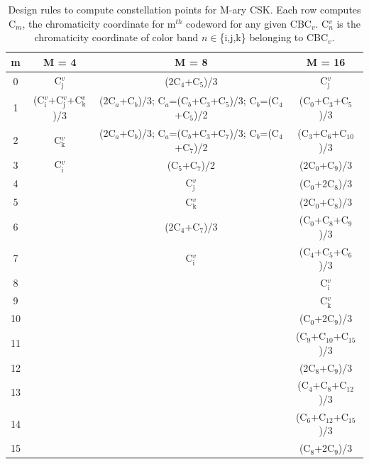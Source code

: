 \documentclass[10pt,letterpaper]{article}
\begin{document}
\begin{table}[t]
\centering
\begin{tabular}{|c|c|c|c|}
\hline
\textbf{m} & \textbf{M = 4} & \textbf{M = 8} & \textbf{M = 16} \\
\hline
0 & C$^{v}_{\text{j}}$ & (2C$_{4}$+C$_{5}$)/3 & C$^{v}_{\text{j}}$\\
1 & (C$^{v}_{\text{i}}$+C$^{v}_{\text{j}}$+C$^{v}_{\text{k}}$)/3 & (2C$_{a}$+C$_{b}$)/3; C$_{a}$=(C$_{b}$+C$_{3}$+C$_{5}$)/3; C$_{b}$=(C$_{4}$+C$_{5}$)/2 & (C$_{0}$+C$_{3}$+C$_{5}$)/3 \\
2 & C$^{v}_{\text{k}}$ & (2C$_{a}$+C$_{b}$)/3; C$_{a}$=(C$_{b}$+C$_{3}$+C$_{7}$)/3; C$_{b}$=(C$_{4}$+C$_{7}$)/2 & (C$_{3}$+C$_{6}$+C$_{10}$)/3 \\
3 & C$^{v}_{\text{i}}$ & (C$_{5}$+C$_{7}$)/2 & (2C$_{0}$+C$_{9}$)/3 \\
\cline{2-2}
4 & & C$^{v}_{\text{j}}$ & (C$_{0}$+2C$_{8}$)/3 \\
5 & & C$^{v}_{\text{k}}$ & (2C$_{0}$+C$_{8}$)/3 \\
6 & & (2C$_{4}$+C$_{7}$)/3 & (C$_{0}$+C$_{8}$+C$_{9}$)/3 \\
7 & & C$^{v}_{\text{i}}$ & (C$_{4}$+C$_{5}$+C$_{6}$)/3 \\
\cline{3-3}
8 & & & C$^{v}_{\text{i}}$ \\
9 & & & C$^{v}_{\text{k}}$ \\
10 & & & (C$_{0}$+2C$_{9}$)/3 \\
11 & & & (C$_{9}$+C$_{10}$+C$_{15}$)/3 \\
12 & & & (2C$_{8}$+C$_{9}$)/3 \\
13 & & & (C$_{4}$+C$_{8}$+C$_{12}$)/3 \\
14 & & & (C$_{6}$+C$_{12}$+C$_{15}$)/3 \\
15 & & & (C$_{8}$+2C$_{9}$)/3 \\
\hline
\end{tabular}
\caption{Design rules to compute constellation points for M-ary CSK. Each row computes C$_{m}$, the chromaticity coordinate for m$^{th}$ codeword for any given CBC$_{v}$. C$^{v}_{n}$ is the chromaticity coordinate of color band $n\in$\{i,j,k\} belonging to CBC$_{v}$.}
\label{tMCSK}
\end{table}
\end{document}
